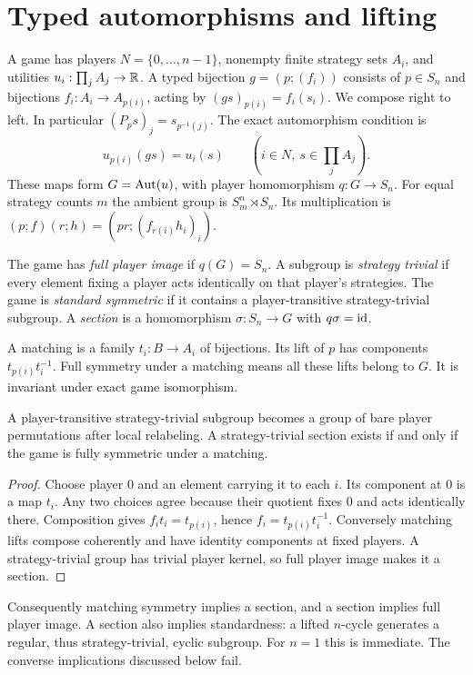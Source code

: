 \section{Typed automorphisms and lifting}\label{sec:02-preliminaries}
A game has players $N=\{0,\ldots,n-1\}$, nonempty finite strategy sets $A_i$,
and utilities $u_i:\prod_j A_j\to\mathbb R$. A typed bijection $g=(p;(f_i))$ consists
of $p\in S_n$ and bijections $f_i:A_i\to A_{p(i)}$, acting by
$(gs)_{p(i)}=f_i(s_i)$. We compose right to left. In particular
$(P_p s)_j=s_{p^{-1}(j)}$. The exact automorphism condition is
\begin{equation}\label{eq:automorphism}
 u_{p(i)}(gs)=u_i(s)\qquad(i\in N,\ s\in\prod_j A_j).
\end{equation}
These maps form $G=\operatorname{Aut}(u)$, with player homomorphism $q:G\to S_n$.
For equal strategy counts $m$ the ambient group is $S_m^n\rtimes S_n$.
Its multiplication is
$(p;f)(r;h)=(pr;(f_{r(i)}h_i)_i)$.

\begin{definition}\label{definition:02-preliminaries-1}
The game has \emph{full player image} if $q(G)=S_n$. A subgroup is
\emph{strategy trivial} if every element fixing a player acts identically
on that player's strategies. The game is \emph{standard symmetric} if it
contains a player-transitive strategy-trivial subgroup. A \emph{section}
is a homomorphism $\sigma:S_n\to G$ with $q\sigma=\mathrm{id}$.
\end{definition}
A matching is a family $t_i:B\to A_i$ of bijections. Its lift of $p$ has
components $t_{p(i)}t_i^{-1}$. Full symmetry under a matching means all these
lifts belong to $G$. It is invariant under exact game isomorphism.

\begin{lemma}\label{lem:matching}
A player-transitive strategy-trivial subgroup becomes a group of bare player
permutations after local relabeling. A strategy-trivial section exists if and
only if the game is fully symmetric under a matching.
\end{lemma}
\begin{proof}
Choose player 0 and an element carrying it to each $i$. Its component at 0 is
a map $t_i$. Any two choices agree because their quotient fixes 0 and acts
identically there. Composition gives $f_i t_i=t_{p(i)}$, hence
$f_i=t_{p(i)}t_i^{-1}$. Conversely matching lifts compose coherently and have
identity components at fixed players. A strategy-trivial group has trivial
player kernel, so full player image makes it a section.
\end{proof}
Consequently matching symmetry implies a section, and a section implies full
player image. A section also implies standardness: a lifted $n$-cycle generates
a regular, thus strategy-trivial, cyclic subgroup. For $n=1$ this is immediate.
The converse implications discussed below fail.

